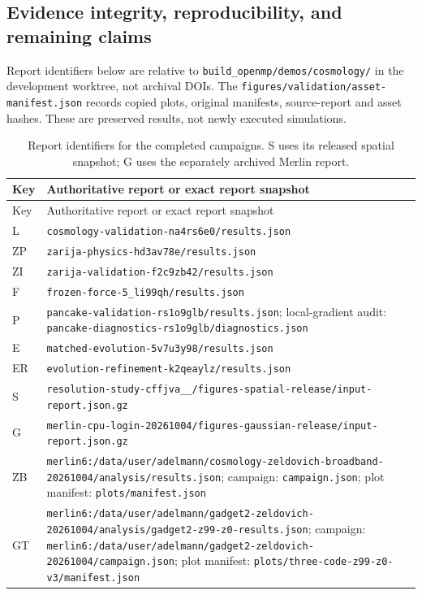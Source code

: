 \subsection{Evidence integrity, reproducibility, and remaining claims}
\label{app:provenance}

Report identifiers below are relative to
\nolinkurl{build_openmp/demos/cosmology/} in the development worktree, not
archival DOIs.  The \nolinkurl{figures/validation/asset-manifest.json} records
copied plots, original manifests, source-report and asset hashes.  These are
preserved results, not newly executed simulations.

\begingroup
\small
\setlength{\LTcapwidth}{\textwidth}
\begin{longtable}{@{}p{}>{\raggedright\arraybackslash}p{}@{}}
\caption{Report identifiers for the completed campaigns.  S uses its released
spatial snapshot; G uses the separately archived Merlin report.}
\label{tab:app-reports}\\
\toprule Key & Authoritative report or exact report snapshot \\
\midrule
\endfirsthead
\toprule Key & Authoritative report or exact report snapshot \\
\midrule
\endhead
L & \nolinkurl{cosmology-validation-na4rs6e0/results.json} \\
ZP & \nolinkurl{zarija-physics-hd3av78e/results.json} \\
ZI & \nolinkurl{zarija-validation-f2c9zb42/results.json} \\
F & \nolinkurl{frozen-force-5_li99qh/results.json} \\
P & \nolinkurl{pancake-validation-rs1o9glb/results.json}; local-gradient audit:
  \nolinkurl{pancake-diagnostics-rs1o9glb/diagnostics.json} \\
E & \nolinkurl{matched-evolution-5v7u3y98/results.json} \\
ER & \nolinkurl{evolution-refinement-k2qeaylz/results.json} \\
S & \nolinkurl{resolution-study-cffjva__/figures-spatial-release/input-report.json.gz} \\
G & \nolinkurl{merlin-cpu-login-20261004/figures-gaussian-release/input-report.json.gz} \\
ZB & \nolinkurl{merlin6:/data/user/adelmann/cosmology-zeldovich-broadband-20261004/analysis/results.json};
  campaign: \nolinkurl{campaign.json}; plot manifest:
  \nolinkurl{plots/manifest.json} \\
GT & \nolinkurl{merlin6:/data/user/adelmann/gadget2-zeldovich-20261004/analysis/gadget2-z99-z0-results.json};
  campaign: \nolinkurl{merlin6:/data/user/adelmann/gadget2-zeldovich-20261004/campaign.json};
  plot manifest: \nolinkurl{plots/three-code-z99-z0-v3/manifest.json} \\
\bottomrule
\end{longtable}
\endgroup

